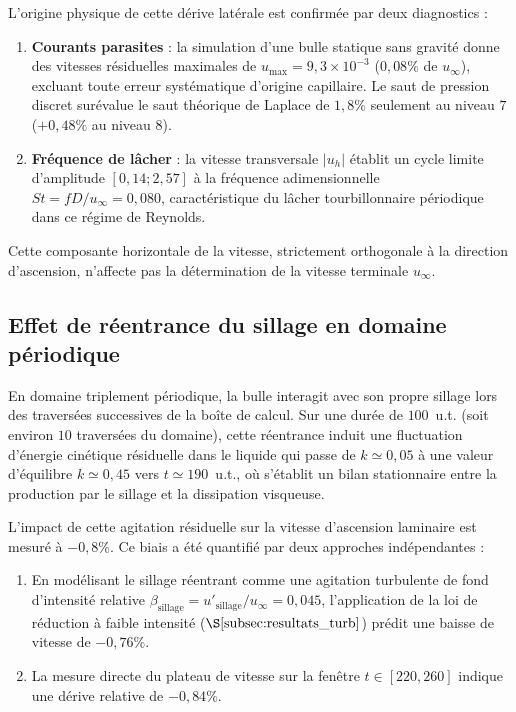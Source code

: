 L'origine physique de cette dérive latérale est confirmée par deux diagnostics :
\begin{enumerate}
    \item \textbf{Courants parasites} : la simulation d'une bulle statique sans gravité donne des vitesses résiduelles maximales de $u_{\max} = 9{,}3\times10^{-3}$ ($0{,}08\%$ de $u_\infty$), excluant toute erreur systématique d'origine capillaire. Le saut de pression discret surévalue le saut théorique de Laplace de $1{,}8\%$ seulement au niveau $7$ ($+0{,}48\%$ au niveau $8$).
    \item \textbf{Fréquence de lâcher} : la vitesse transversale $|u_h|$ établit un cycle limite d'amplitude $[0{,}14 ; 2{,}57]$ à la fréquence adimensionnelle $St = fD/u_\infty = 0{,}080$, caractéristique du lâcher tourbillonnaire périodique dans ce régime de Reynolds.
\end{enumerate}

Cette composante horizontale de la vitesse, strictement orthogonale à la direction d'ascension, n'affecte pas la détermination de la vitesse terminale $u_\infty$.


\subsection{Effet de réentrance du sillage en domaine périodique}

En domaine triplement périodique, la bulle interagit avec son propre sillage lors des traversées successives de la boîte de calcul. Sur une durée de $100$~u.t. (soit environ $10$ traversées du domaine), cette réentrance induit une fluctuation d'énergie cinétique résiduelle dans le liquide qui passe de $k \simeq 0{,}05$ à une valeur d'équilibre $k \simeq 0{,}45$ vers $t \simeq 190$~u.t., où s'établit un bilan stationnaire entre la production par le sillage et la dissipation visqueuse.

L'impact de cette agitation résiduelle sur la vitesse d'ascension laminaire est mesuré à $-0{,}8\%$. Ce biais a été quantifié par deux approches indépendantes :
\begin{enumerate}
    \item En modélisant le sillage réentrant comme une agitation turbulente de fond d'intensité relative $\beta_{\text{sillage}} = u'_{\text{sillage}}/u_\infty = 0{,}045$, l'application de la loi de réduction à faible intensité ($\S\ref{subsec:resultats_turb}$) prédit une baisse de vitesse de $-0{,}76\%$.
    \item La mesure directe du plateau de vitesse sur la fenêtre $t \in [220, 260]$ indique une dérive relative de $-0{,}84\%$.
\end{enumerate}

